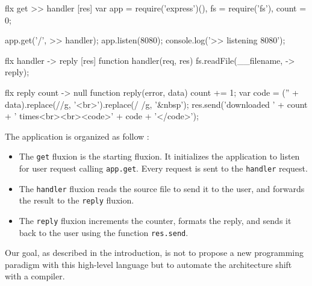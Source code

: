 \begin{code}[flx, caption={Manual transformation of the example application in our high-level fluxional language},label={lst:fluxional}]
flx get
>> handler [res]
  var app = require('express')(),
      fs = require('fs'),
      count = 0;

  app.get('/', >> handler);
  app.listen(8080);
  console.log('>> listening 8080');

flx handler
-> reply [res]
  function handler(req, res) {
    fs.readFile(__filename, -> reply);
  }

flx reply {count}
-> null
  function reply(error, data) {
    count += 1;
    var code = ('' + data).replace(/\n/g, '<br>').replace(/ /g, '&nbsp');
    res.send('downloaded ' + count + ' times<br><br><code>' + code + '</code>');
  }
\end{code}

The application is organized as follow :
\begin{itemize}
  \item The \texttt{get} fluxion is the starting fluxion.
  It initializes the application to listen for user request calling \texttt{app.get}.
  Every request is sent to the \texttt{handler} request.
  \item The \texttt{handler} fluxion reads the source file to send it to the user, and forwards the result to the \texttt{reply} fluxion.
  \item The \texttt{reply} fluxion increments the counter, formats the reply, and sends it back to the user using the function \texttt{res.send}.
\end{itemize}

Our goal, as described in the introduction, is not to propose a new programming paradigm with this high-level language but to automate the architecture shift with a compiler.